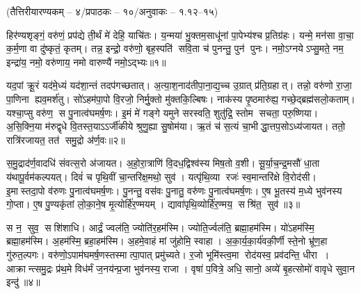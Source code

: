 
\vspace{-1ex}
\centerline{\normalsize (तैत्तिरीयारण्यकम् – ४/प्रपाठकः – १०/अनुवाकः – १.१२–१५)}

हिर॑ण्यशृङ्गं॒ वरु॑णं॒ प्रप॑द्ये ती॒र्थं मे॑ देहि॒ याचि॑तः। य॒न्मया॑ भु॒क्तम॒साधू॑नां पा॒पेभ्य॑श्च प्र॒तिग्र॑हः। यन्मे॒ मन॑सा वा॒चा॒ क॒र्म॒णा वा दु॑ष्कृतं॒ कृतम्। तन्न॒ इन्द्रो॒ वरु॑णो॒ बृह॒स्पति॑ सवि॒ता च॑ पुनन्तु॒ पुन॑ पुनः। नमो॒ऽग्नयेऽप्सु॒मते॒ नम॒ इन्द्रा॑य॒ नमो॒ वरु॑णाय॒ नमो वारुण्यै॑ नमो॒ऽद्भ्यः॥१॥

 यद॒पां क्रू॒रं यद॑मे॒ध्यं यद॑शा॒न्तं तदप॑गच्छतात्। अ॒त्या॒श॒नाद॑ती\-पा॒ना॒द्य॒च्च उ॒ग्रात् प्र॑ति॒ग्रहात्। तन्नो॒ वरु॑णो रा॒जा॒ पा॒णिना ह्यव॒मर्\mbox{}श॑तु। सो॑ऽहम॑पा॒पो वि॒रजो॒ निर्मु॒क्तो मु॑क्तकि॒ल्बिषः। नाक॑स्य पृ॒ष्ठमारु॑ह्य॒ गच्छे॒द्ब्रह्म॑सलो॒कताम्। यश्चा॒प्सु वरु॑ण॒ स पु॒नात्व॑घमर्\mbox{}ष॒णः। इ॒मं मे॑ गङ्गे यमुने सरस्वति॒ शुतु॑द्रि॒ स्तोम सचता॒ परु॒ष्णिया। अ॒सि॒क्नि॒या म॑रुद्\mbox{}वृधे वि॒तस्त॒याऽऽर्जी॑कीये श्रुणु॒ह्या सु॒षोम॑या। ऋ॒तं च॑ स॒त्यं चा॒भीद्धा॒त्तप॒सोऽध्य॑जायत। ततो॒ रात्रि॑रजायत॒ तत॑ समु॒द्रो अ॑र्ण॒वः॥२॥
 
 स॒मु॒द्राद॑र्ण॒वादधि॑ संवत्स॒रो अ॑जायत। अ॒हो॒रा॒त्राणि॑ वि॒दध॒द्विश्व॑स्य मिष॒तो व॒शी। सू॒र्या॒च॒न्द्र॒मसौ॑ धा॒ता य॑थापू॒र्वम॑कल्पयत्। दिवं॑ च पृथि॒वीं चा॒न्तरि॑क्ष॒मथो॒ सुव॑। यत्पृ॑थि॒व्या रजः॑ स्व॒मान्तरि॑क्षे वि॒रोद॑सी। इ॒मास्तदा॒पो व॑रुणः पु॒नात्व॑घमर्\mbox{}ष॒णः। पु॒नन्तु॒ वस॑वः पु॒नातु॒ वरु॑णः पु॒नात्व॑घमर्\mbox{}ष॒णः। ए॒ष भू॒तस्य॑ म॒ध्ये भुव॑नस्य गो॒प्ता। ए॒ष पु॒ण्यकृ॑तां लो॒का॒ने॒ष मृ॒त्योर्\mbox{}हि॑र॒ण्मयम्। द्यावा॑पृथि॒व्योर्\mbox{}हि॑र॒ण्मय॒ सश्रि॑त॒ सुव॑॥३॥

स न॒ सुव॒ सशि॑शाधि। आर्द्रं॒ ज्वल॑ति॒ ज्योति॑र॒हम॑स्मि। ज्योति॒र्ज्वल॑ति॒ ब्रह्मा॒हम॑स्मि। यो॑ऽहम॑स्मि॒ ब्रह्मा॒हम॑स्मि। अ॒हम॑स्मि॒ ब्रहा॒हम॑स्मि। अ॒हमे॒वाहं मां जु॑होमि॒ स्वाहा।
 अ॒का॒र्य॒का॒र्य॑वकी॒र्णी स्ते॒नो भ्रू॑ण॒हा गु॑रुत॒ल्पगः। वरु॑णो॒ऽपाम॑घ\-मर्\mbox{}ष॒णस्तस्मात्पा॒पात् प्रमु॑च्यते। र॒जो भूमि॑स्त्व॒मा रोद॑यस्व॒ प्रव॑दन्ति॒ धीरा। आक्रान्त्समु॒द्रः प्र॑थ॒मे विध॑र्मं ज॒नय॑न्प्र॒जा भुव॑नस्य॒ राजा। वृषा॑ प॒वित्रे॒ अधि॒ सानो॒ अव्ये॑ बृ॒हत्सोमो॑ वावृधे सुवा॒न इन्दु॑॥४॥